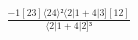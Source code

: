 \documentclass[varwidth, border=5pt]{standalone}
\begin{document}
\begin{my}
$\begin{gathered}
\scriptscriptstyle\frac{-1[23]⟨24⟩²⟨2|1+4|3][12]}{⟨2|1+4|2]³}
\end{gathered}$
\end{my}
\end{document}
